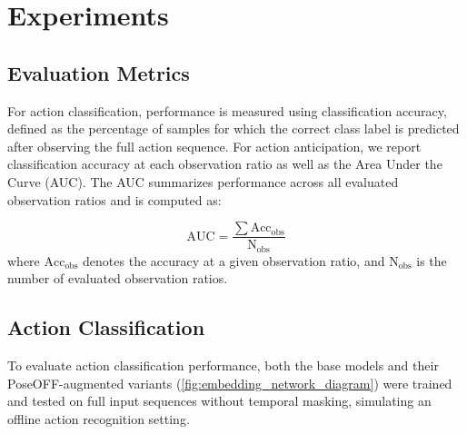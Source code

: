\documentclass[letterpaper, 10 pt, conference]{ieeeconf}
\begin{document}
\section{Experiments}%
\label{sec:experiments}

\subsection{Evaluation Metrics}
For action classification, performance is measured using classification accuracy, defined as the percentage of samples for which the correct class label is predicted after observing the full action sequence.
For action anticipation, we report classification accuracy at each observation ratio as well as the Area Under the Curve (AUC). The AUC summarizes performance across all evaluated observation ratios and is computed as:

\[ \text{AUC}=\frac{\sum{\text{Acc}}_{\text{obs}}}{\text{N}_{\text{obs}}}\]
where $\text{Acc}_{\text{obs}}$ denotes the accuracy at a given observation ratio, and $\text{N}_{\text{obs}}$ is the number of evaluated observation ratios.


\subsection{Action Classification}%
\label{subsec:exp_action_classification}
To evaluate action classification performance, both the base models and their PoseOFF-augmented variants (\autoref{fig:embedding_network_diagram}) were trained and tested on full input sequences without temporal masking, simulating an offline action recognition setting.
\end{document}
